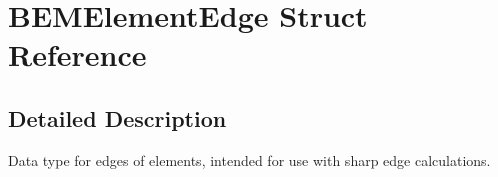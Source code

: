 \section{BEMElementEdge Struct Reference}
\label{structBEMElementEdge}


\subsection{Detailed Description}
Data type for edges of elements, intended for use with sharp edge calculations. 

